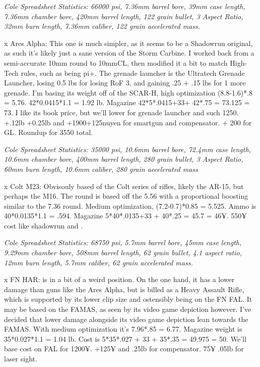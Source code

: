 \begin{multicols*}{2}
	\textit{\textcolor{OliveGreen}{Cole Spreadsheet Statistics: 66000 psi, 7.36mm barrel bore, 39mm case length, 7.36mm chamber bore, 420mm barrel length, 122 grain bullet, 3 Aspect Ratio, 32mm burn length, 7.36mm caliber, 122 grain accelerated mass.}}
	
	x Ares Alpha: This one is much simpler, as it seems to be a Shadowrun original, as such it's likely just a sane version of the Storm Carbine. I worked back from a semi-accurate 10mm round to 10mmCL, then modified it a bit to match High-Tech rules, such as being pi+. The grenade launcher is the Ultratech Grenade Launcher, losing 0.5 lbs for losing RoF 3, and gaining .25 + .15 lbs for 1 more grenade. I'm basing its weight off of the SCAR-H, high optimization (8.8-1.6)*.8 = 5.76. 42*0.0415*1.1 = 1.92 lb. Magazine 42*5*.0415+33+ 42*.75 = 73.125 = 73. I like its book price, but we'll lower for grenade launcher and such 1250. +.12lb +0.25lb and +1900+125nuyen for smartgun and compensator. + 200 for GL. Roundup for 3550 total.
	
	\textit{\textcolor{OliveGreen}{Cole Spreadsheet Statistics: 35000 psi, 10.6mm barrel bore, 72.4mm case length, 10.6mm chamber bore, 400mm barrel length, 280 grain bullet, 3 Aspect Ratio, 60mm burn length, 10.6mm caliber, 280 grain accelerated mass}}
	
	x Colt M23: Obvisouly based of the Colt series of rifles, likely the AR-15, but perhaps the M16. The round is based off the 5.56 with a proportional boosting similar to the 7.36 round. Medium optimization, (7.2-0.7)*0.85 = 5.525. Ammo is 40*0.0135*1.1 = .594. Magazine 5*40*.0135+33 + 40*.25 = 45.7 = 46¥. 550¥ cost like shadowrun and \GURPS.
	
	\textit{\textcolor{OliveGreen}{Cole Spreadsheet Statistics: 68750 psi, 5.7mm barrel bore, 45mm case length, 9.29mm chamber bore, 508mm barrel length, 62 grain bullet, 4.1 aspect ratio, 12mm burn length, 5.7mm caliber, 62 grain accelerated mass.}}
	
	x FN HAR: is in a bit of a weird position. On the one hand, it has a lower damage than guns like the Ares Alpha, but is billed as a Heavy Assault Rifle, which is supported by its lower clip size and ostensibly being on the FN FAL. It may be based on the FAMAS, as seen by its video game depiction however. I've decided that lower damage alongside its video game depiction lean towards the FAMAS. With medium optimization it's 7.96*.85 = 6.77.  Magazine weight is  35*0.027*1.1 = 1.04 lb. Cost is 5*35*.027 + 33 + 35*.35 = 49.975 = 50. We'll base cost on FAL for 1200¥. +125¥ and .25lb for compensator. 75¥ .05lb for laser sight.
	

\end{multicols*}
